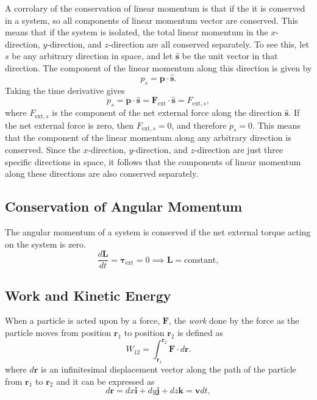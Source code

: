 \documentclass[12pt]{article}
\begin{document}
A corrolary of the conservation of linear momentum is that if the it is conserved in a system, so all components of linear momentum vector are conserved. This means that if the system is isolated, the total linear momentum in the $x$-direction, $y$-direction, and $z$-direction are all conserved separately. To see this, let $s$ be any arbitrary direction in space, and let $\hat{\mathbf{s}}$ be the unit vector in that direction. The component of the linear momentum along this direction is given by
\begin{equation}
    p_s = \mathbf{p}\cdot\hat{\mathbf{s}}.
\end{equation}
Taking the time derivative gives
\begin{equation}
    \dot{p}_s = \dot{\mathbf{p}}\cdot\hat{\mathbf{s}} = \mathbf{F}_{\text{ext}}\cdot\hat{\mathbf{s}} = F_{\text{ext},s},
\end{equation}
where $F_{\text{ext},s}$ is the component of the net external force along the direction $\hat{\mathbf{s}}$. If the net external force is zero, then $F_{\text{ext},s} = 0$, and therefore $\dot{p}_s = 0$. This means that the component of the linear momentum along any arbitrary direction is conserved. Since the $x$-direction, $y$-direction, and $z$-direction are just three specific directions in space, it follows that the components of linear momentum along these directions are also conserved separately. 


\subsection{Conservation of Angular Momentum}
The angular momentum of a system is conserved if the net external torque acting on the system is zero.
\begin{equation}
    \frac{d\mathbf{L}}{dt} = \boldsymbol{\tau}_{\text{ext}} = 0 \implies \mathbf{L} = \text{constant},
\end{equation}

\subsection{\label{sec:work-kinetic-energy}Work and Kinetic Energy}

When a particle is acted upon by a force, $\mathbf{F}$, the \emph{work} done by the force as the particle moves from position $\mathbf{r}_1$ to position $\mathbf{r}_2$ is defined as
\begin{equation}
    W_{12} = \int_{\mathbf{r}_1}^{\mathbf{r}_2} \mathbf{F}\cdot d\mathbf{r}.
\end{equation}
where $d\mathbf{r}$ is an infinitesimal displacement vector along the path of the particle from $\mathbf{r}_1$ to $\mathbf{r}_2$ and it can be expressed as
\begin{equation}
    d\mathbf{r} = dx\mathbf{i} + dy\mathbf{j} + dz\mathbf{k} = \mathbf{v} dt,
\end{equation}
\end{document}
